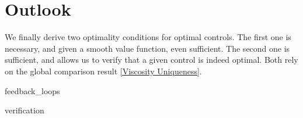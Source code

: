 \chapter{Outlook}

We finally derive two optimality conditions for optimal controls. The first one is necessary, and given a smooth value function, even sufficient. The second one is sufficient, and allows us to verify that a given control is indeed optimal. Both rely on the global comparison result \ref{Viscosity Uniqueness}.

{feedback_loops}

{verification}